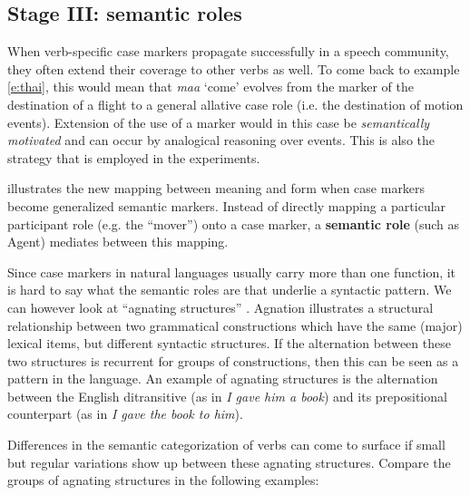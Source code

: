 \subsection{Stage III: semantic roles}
\label{s:stage3}

When verb-specific case markers propagate successfully in a speech community, they often extend their coverage to other verbs as well. To come back to example \ref{e:thai}, this would mean that {\em maa} `come' evolves from the marker of the destination of a flight to a general allative case role (i.e. the destination of motion events). Extension of the use of a marker would in this case be {\em semantically motivated} and can occur by analogical reasoning over events. This is also the strategy that is employed in the experiments. 

 illustrates the new mapping between meaning and form when case markers become generalized semantic markers. Instead of directly mapping a particular participant role (e.g. the ``mover'') onto a case marker, a {\bfseries semantic role} (such as Agent) mediates between this mapping.

Since case markers in natural languages usually carry more than one function, it is hard to say what the semantic roles are that underlie a syntactic pattern. We can however look at ``agnating structures'' \citep{gleason65linguistics}. Agnation illustrates a structural relationship between two grammatical constructions which have the same (major) lexical items, but different syntactic structures. If the alternation between these two structures is recurrent for groups of constructions, then this can be seen as a pattern in the language. An example of agnating structures is the alternation between the English ditransitive (as in {\em I gave him a book}) and its prepositional counterpart (as in {\em I gave the book to him}). 

Differences in the semantic categorization of verbs can come to surface if small but regular variations show up between these agnating structures. Compare the groups of agnating structures in the following examples:

